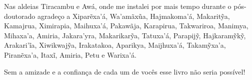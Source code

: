 Nas aldeias Tiracambu e Awá, onde me instalei por mais tempo durante o
pós-doutorado agradeço a Xiparẽxa'á, Wa'amãxũa, Hajmakoma'á, Makaritỹa,
Kamajrua, Ximirapia, Maihuxa'á, Pakawãja, Karapirua, Takwariroa,
Manimya, Mihaxa'a, Amiria, Jakara'yra, Makarikarỹa, Tatuxa'á, Parapijỹ,
Hajkaramỹkỹ, Arakari'ĩa, Xiwikwajỹa, Irakatakoa, Aparikya, Maijhuxa'á,
Takamỹxa'a, Piranẽxa'a, Itaxĩ, Amiria, Petu e Warixa'á.

Sem a amizade e a confiança de cada um de vocês esse livro não seria
possível!
